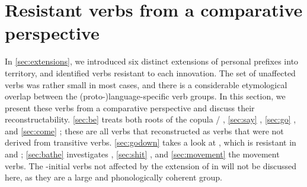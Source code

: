 \section{Resistant verbs from a comparative perspective}
\label{sec:verbs}
In \cref{sec:extensions}, we introduced six distinct extensions of personal prefixes into  territory, and identified verbs resistant to each innovation.
The set of unaffected verbs was rather small in most cases, and there is a considerable etymological overlap between the (proto-)language-specific verb groups.
In this section, we present these verbs from a comparative perspective and discuss their reconstructability.
\cref{sec:be} treats both roots of the copula / , \cref{sec:say}  , \cref{sec:go}  , and \cref{sec:come}  ; these are all verbs that \textcite{gildea2007greenberg} reconstructed as  verbs that were not derived from transitive verbs.
\cref{sec:godown} takes a look at  , which is resistant in \PTir and \PPek; \cref{sec:bathe} investigates \PPek {} , \cref{sec:shit} \trio {}, and \cref{sec:movement} the \akuriyo movement verbs.
The -initial verbs not affected by the extension of  in \akuriyo {} will not be discussed here, as they are a large and phonologically coherent group.




